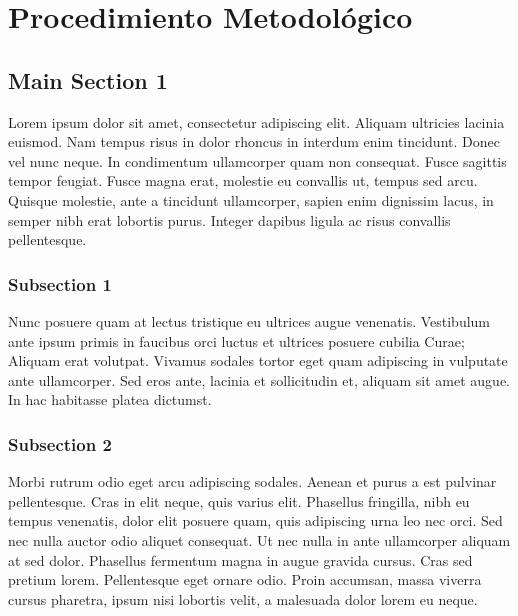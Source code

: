 
\chapter{Procedimiento Metodológico} %

\label{Capitulo3} %


\section{Main Section 1}

Lorem ipsum dolor sit amet, consectetur adipiscing elit. Aliquam ultricies lacinia euismod. Nam tempus risus in dolor rhoncus in interdum enim tincidunt. Donec vel nunc neque. In condimentum ullamcorper quam non consequat. Fusce sagittis tempor feugiat. Fusce magna erat, molestie eu convallis ut, tempus sed arcu. Quisque molestie, ante a tincidunt ullamcorper, sapien enim dignissim lacus, in semper nibh erat lobortis purus. Integer dapibus ligula ac risus convallis pellentesque.

\subsection{Subsection 1}

Nunc posuere quam at lectus tristique eu ultrices augue venenatis. Vestibulum ante ipsum primis in faucibus orci luctus et ultrices posuere cubilia Curae; Aliquam erat volutpat. Vivamus sodales tortor eget quam adipiscing in vulputate ante ullamcorper. Sed eros ante, lacinia et sollicitudin et, aliquam sit amet augue. In hac habitasse platea dictumst.


\subsection{Subsection 2}
Morbi rutrum odio eget arcu adipiscing sodales. Aenean et purus a est pulvinar pellentesque. Cras in elit neque, quis varius elit. Phasellus fringilla, nibh eu tempus venenatis, dolor elit posuere quam, quis adipiscing urna leo nec orci. Sed nec nulla auctor odio aliquet consequat. Ut nec nulla in ante ullamcorper aliquam at sed dolor. Phasellus fermentum magna in augue gravida cursus. Cras sed pretium lorem. Pellentesque eget ornare odio. Proin accumsan, massa viverra cursus pharetra, ipsum nisi lobortis velit, a malesuada dolor lorem eu neque.


